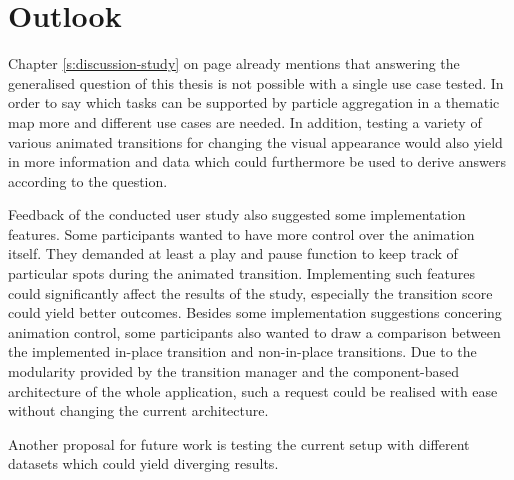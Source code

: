 \section{Outlook}
\label{s:outlook}
Chapter \ref{s:discussion-study} on page \pageref{s:discussion-study} already mentions that answering the generalised question of this thesis is not possible with a single use case tested. In order to say which tasks can be supported by particle aggregation in a thematic map more and different use cases are needed. In addition, testing a variety of various animated transitions for changing the visual appearance would also yield in more information and data which could furthermore be used to derive answers according to the question.

Feedback of the conducted user study also suggested some implementation features. Some participants wanted to have more control over the animation itself. They demanded at least a play and pause function to keep track of particular spots during the animated transition. Implementing such features could significantly affect the results of the study, especially the transition score could yield better outcomes. Besides some implementation suggestions concering animation control, some participants also wanted to draw a comparison between the implemented in-place transition and non-in-place transitions. Due to the modularity provided by the transition manager and the component-based architecture of the whole application, such a request could be realised with ease without changing the current architecture.

Another proposal for future work is testing the current setup with different datasets which could yield diverging results.




